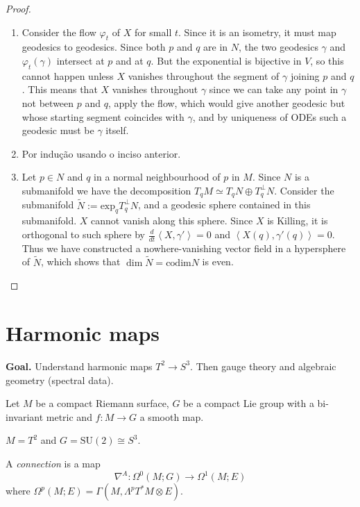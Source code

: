 \begin{proof}
\begin{enumerate}
\item Consider the flow $\varphi_t$ of $X$
for small $t$.
Since it is an isometry, it must map
geodesics to geodesics.
Since both $p$ and $q$ are in $N$, the two
geodesics
$\gamma$ and $\varphi_t(\gamma)$ intersect at
$p$ and at $q$.
But the exponential is bijective in $V$, so
this cannot happen
unless $X$ vanishes throughout the segment of
$\gamma$ joining $p$ and $q$.
This means that $X$ vanishes throughout
$\gamma$ since
we can take any point in $\gamma$ not between
$p$ and $q$,
apply the flow, which would give another
geodesic but
whose starting segment coincides with
$\gamma$,
and by uniqueness of ODEs such a geodesic
must be $\gamma$ itself.

\item Por indução usando o inciso anterior.

\item Let $p \in N$ and $q$ in a normal
neighbourhood of $p$ in $M$.
Since $N$ is a submanifold we have the
decomposition
$T_qM\simeq T_q N\oplus T_q^\perp N$.
Consider the submanifold
$\tilde{N}:=\text{exp}_q T_q^\perp N$,
and a geodesic sphere contained in this
submanifold.
$X$ cannot vanish along this sphere.
Since $X$ is Killing, it is orthogonal to
such sphere
by $\frac{d}{dt}\left\langle{}X,\gamma'\right\rangle{}=0$
and $\left\langle{}X(q),\gamma'(q)\right\rangle{}=0$.
Thus we have constructed a nowhere-vanishing
vector field
in a hypersphere of $\tilde{N}$,
which shows that $\dim \tilde{N}=\text{codim
}N$ is even.
\end{enumerate}
\end{proof}

\section{Harmonic maps}
\label{section-harmonic-maps}

{\bf Goal.} Understand harmonic maps $T^2 \to
S^3$. Then gauge theory and
algebraic geometry (spectral data).

Let $M$ be a compact Riemann surface, $G$ be
a compact Lie group with a
bi-invariant metric and $f:M\to G$ a smooth
map.

\begin{example}
\label{example-torus}
$M=T^2$ and $G=\text{SU}(2)\cong S^3$.
\end{example}

\begin{definition}
\label{definition-connection}
A {\it connection} is a map
$$
\nabla^A:\Omega^{0}(M;G)\to \Omega^{1}(M;E)
$$
where
$\Omega^{p}(M;E)=\Gamma(M,\Lambda^{p}
T^*M\otimes
E)$.
\end{definition}

